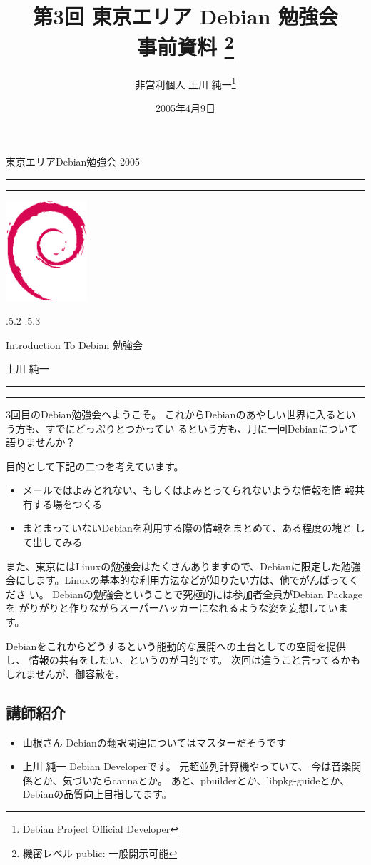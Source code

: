 \documentclass[mingoth]{jsarticle}
\makeatletter
\renewcommand{\section}{\@startsection{section}{1}{\z@}%
    {\Cvs \@plus.5\Cdp \@minus.2\Cdp}%
    {.5\Cvs \@plus.3\Cdp}%
    {\normalfont\Large\headfont\raggedright\centering}} %
\newcommand{\dancersection}[2]{%
\newpage
東京エリアDebian勉強会 2005
\hrule
\vspace{0.5mm}
\hrule
\hfill{}\includegraphics[width=3cm]{image200502/openlogo-nd.eps}\\
\vspace{-4cm}
\begin{center}
  \section{#1}
\end{center}
\hfill{}#2\hspace{3cm}\space\\
\hrule
\hrule
\vspace{1cm}
}
\makeatother
\begin{document}
\begin{titlepage}

\title{
 第3回 東京エリア Debian 勉強会\\事前資料
\footnote{機密レベル public: 一般開示可能}}
\date{2005年4月9日}
\author{非営利個人 上川 純一\thanks{Debian Project Official Developer}} 
\maketitle

\end{titlepage}

\newpage
\tableofcontents

\dancersection{Introduction To Debian 勉強会}{上川 純一}

3回目のDebian勉強会へようこそ。
これからDebianのあやしい世界に入るという方も、すでにどっぷりとつかってい
るという方も、月に一回Debianについて語りませんか？

目的として下記の二つを考えています。

\begin{itemize}
 \item メールではよみとれない、もしくはよみとってられないような情報を情
       報共有する場をつくる
 \item まとまっていないDebianを利用する際の情報をまとめて、ある程度の塊と
       して出してみる
\end{itemize}

また、東京にはLinuxの勉強会はたくさんありますので、Debianに限定した勉強
会にします。Linuxの基本的な利用方法などが知りたい方は、他でがんばってくださ
い。
Debianの勉強会ということで究極的には参加者全員がDebian Packageを
がりがりと作りながらスーパーハッカーになれるような姿を妄想しています。

Debianをこれからどうするという能動的な展開への土台としての空間を提供し、
情報の共有をしたい、というのが目的です。
次回は違うこと言ってるかもしれませんが、御容赦を。

\subsection{講師紹介}

\begin{itemize}
 \item{山根さん} Debianの翻訳関連についてはマスターだそうです
 \item{上川 純一} Debian Developerです。
      元超並列計算機やっていて、
      今は音楽関係とか、気づいたらcannaとか。
      あと、pbuilderとか、libpkg-guideとか、Debianの品質向上目指してます。
\end{itemize}
\end{document}
